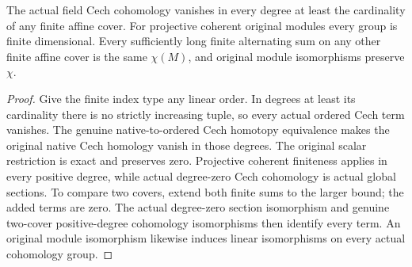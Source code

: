 \begin{theorem}
\label{thm:fc-scheme-coherent-euler-bounded}
\leanok
{}
The actual field Cech cohomology vanishes in every degree at least the
cardinality of any finite affine cover. For projective coherent original
modules every group is finite dimensional. Every sufficiently long
finite alternating sum on any other finite affine cover is the same
$\chi(M)$, and original module isomorphisms preserve $\chi$.
\end{theorem}
\begin{proof}
Give the finite index type any linear order. In degrees at least its
cardinality there is no strictly increasing tuple, so every actual
ordered Cech term vanishes. The genuine native-to-ordered Cech homotopy
equivalence makes the original native Cech homology vanish in those
degrees. The original scalar restriction is exact and preserves zero.
Projective coherent finiteness applies in every positive degree, while
actual degree-zero Cech cohomology is actual global sections. To compare
two covers, extend both finite sums to the larger bound; the added
terms are zero. The actual degree-zero section isomorphism and genuine
two-cover positive-degree cohomology isomorphisms then identify every
term. An original module isomorphism likewise induces linear
isomorphisms on every actual cohomology group.
\end{proof}

